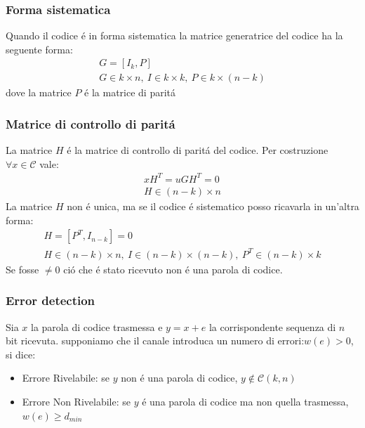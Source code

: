         \subsubsection{Forma sistematica}
            Quando il codice é in forma sistematica la matrice generatrice del codice ha la seguente forma:
            \begin{gather}
                G = [I_k,P]\nonumber \\
                G\in k\times n,\ I\in k\times k,\ P\in k\times (n-k)\nonumber
            \end{gather}
            dove la matrice $P$ é la matrice di paritá
        \subsubsection{Matrice di controllo di paritá}
            La matrice $H$ é la matrice di controllo di paritá del codice. Per costruzione $\forall x \in \mathcal{C}$ vale:
            \begin{gather}
                    xH^T = uGH^T = 0 \nonumber \\
                    H\in (n-k) \times n\nonumber 
            \end{gather}
            La matrice $H$ non é unica, ma se il codice é sistematico posso ricavarla in un'altra forma:
            \begin{gather}
                H = [P^T,I_{n-k}] = 0 \nonumber \\
                H\in (n-k) \times n,\ I\in (n-k)\times (n-k),\ P^T\in (n-k) \times k \nonumber
            \end{gather}
            Se fosse $\neq 0$ ció che é stato ricevuto non é una parola di codice.
        \subsubsection{Error detection}
            Sia $x$ la parola di codice trasmessa e $y=x+e$ la corrispondente sequenza di $n$ bit ricevuta. supponiamo che il canale 
            introduca un numero di errori:$w(e) > 0$, si dice:
            \begin{itemize}
                \item {
                    Errore Rivelabile: se $y$ non é una parola di codice, $y\notin\mathcal{C}(k,n) $
                }
                \item {
                    Errore Non Rivelabile: se $y$ é una parola di codice ma non quella trasmessa, $w(e) \geq d_{min}$ 
                }
            \end{itemize}
